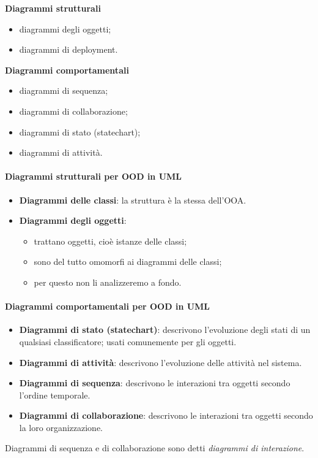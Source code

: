 \documentclass[a4paper,12pt]{article}
\begin{document}
\medskip\noindent
\begin{minipage}[t]{0.45\textwidth}
\textbf{Diagrammi strutturali}
\begin{itemize}
  \item[\textcolor{red}{\checkmark}] diagrammi degli oggetti;
  \item[\textcolor{red}{\checkmark}] diagrammi di deployment.
\end{itemize}
\end{minipage}\hfill
\begin{minipage}[t]{0.5\textwidth}
\textbf{Diagrammi comportamentali}
\begin{itemize}
  \item[\textcolor{red}{\checkmark}] diagrammi di sequenza;
  \item[\textcolor{red}{\checkmark}] diagrammi di collaborazione;
  \item[\textcolor{red}{\checkmark}] diagrammi di stato (statechart);
  \item[\textcolor{red}{\checkmark}] diagrammi di attività.
\end{itemize}
\end{minipage}

\paragraph{Diagrammi strutturali per OOD in UML}
\begin{itemize}
  \item \textbf{Diagrammi delle classi}: la struttura è la stessa dell'OOA.
  \item \textbf{Diagrammi degli oggetti}:
  \begin{itemize}
    \item trattano oggetti, cioè istanze delle classi;
    \item sono del tutto omomorfi ai diagrammi delle classi;
    \item per questo non li analizzeremo a fondo.
  \end{itemize}
\end{itemize}

\paragraph{Diagrammi comportamentali per OOD in UML}
\begin{itemize}
  \item \textbf{Diagrammi di stato (statechart)}: descrivono l'evoluzione degli stati di
        un qualsiasi classificatore; usati comunemente per gli oggetti.
  \item \textbf{Diagrammi di attività}: descrivono l'evoluzione delle attività nel
        sistema.
  \item \textbf{Diagrammi di sequenza}: descrivono le interazioni tra oggetti secondo
        l'ordine temporale.
  \item \textbf{Diagrammi di collaborazione}: descrivono le interazioni tra oggetti
        secondo la loro organizzazione.
\end{itemize}
Diagrammi di sequenza e di collaborazione sono detti \emph{diagrammi di interazione}.
\end{document}
